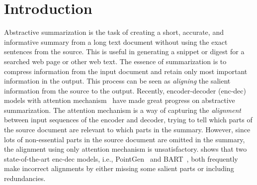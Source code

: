 \section{Introduction}
\label{sec:intro}

Abstractive summarization is the task of creating a short, accurate,
and informative summary from a long text document
without using the exact sentences from the source.
This is useful in generating a snippet or digest for a searched web page or
other web text.
The essence of summarization is to compress information from the input
document and retain only most important information in the output.
This process can be seen as {\em aligning} the salient information
from the source to the output.
Recently, encoder-decoder (enc-dec) 
models with attention mechanism~\cite{NallapatiZSGX16,SeeLM17,Joint18,CelikyilmazBHC18,UniLM19,AbsSnippet20}
have made great progress on abstractive summarization.
The attention mechanism is a way of capturing the \textit{alignment}
between input sequences of the encoder and decoder, trying to tell 
which parts of the source document are relevant to which parts in the summary.
However, since lots of non-essential parts in the source document are 
omitted in the summary, the alignment using only attention mechanism is 
unsatisfactory.   shows that two state-of-the-art 
enc-dec models, 
i.e., PointGen~\cite{SeeLM17} and BART~\cite{BART19}, both frequently make 
incorrect alignments by either missing some salient parts or including 
redundancies.

